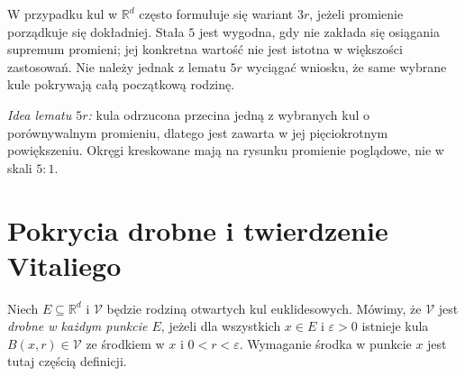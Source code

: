 \begin{uwaga}
W przypadku kul w $\mathbb R^d$ często formułuje się wariant
$3r$, jeżeli promienie porządkuje się dokładniej. Stała $5$
jest wygodna, gdy nie zakłada się osiągania supremum promieni;
jej konkretna wartość nie jest istotna w większości zastosowań.
Nie należy jednak z lematu $5r$ wyciągać wniosku, że same
wybrane kule pokrywają całą początkową rodzinę.
\end{uwaga}

\begin{center}
\end{center}
\noindent\textit{Idea lematu $5r$:} kula odrzucona przecina jedną
z wybranych kul o porównywalnym promieniu, dlatego jest
zawarta w jej pięciokrotnym powiększeniu. Okręgi
kreskowane mają na rysunku promienie poglądowe, nie
w skali $5{:}1$.

\section{Pokrycia drobne i twierdzenie Vitaliego}
\begin{definicja}
\label{def:vitali-fine-24}
Niech $E\subseteq\mathbb R^d$ i $\mathcal V$ będzie rodziną
otwartych kul euklidesowych. Mówimy, że $\mathcal V$ jest
\emph{drobne w każdym punkcie $E$}, jeżeli dla wszystkich
$x\in E$ i $\varepsilon>0$ istnieje kula
$B(x,r)\in\mathcal V$ ze środkiem w $x$ i $0<r<\varepsilon$.
Wymaganie środka w punkcie $x$ jest tutaj częścią definicji.
\end{definicja}

